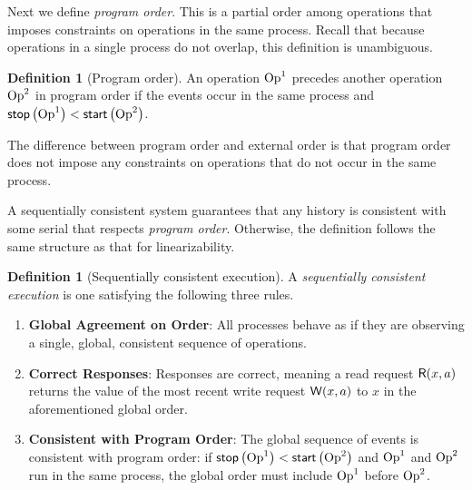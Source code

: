 \documentclass[]             %
{NASA}                       %
\theoremstyle{definition}
\newtheorem{definition}[theorem]{Definition}
\providecommand{\tightlist}{%
  \setlength{\itemsep}{0pt}\setlength{\parskip}{0pt}}
\begin{document}
Next we define \emph{program order}. This is a partial order among
operations that imposes constraints on operations in the same
process. Recall that because operations in a single process do not
overlap, this definition is unambiguous.

\begin{definition}[Program order]
  An operation $\mathrm{Op}^1$ precedes another operation $\mathrm{Op}^2$ in program
  order if the events occur in the same process and
  $\mathsf{stop}\left(\mathrm{Op}^1\right) < \mathsf{start}\left(\mathrm{Op}^2\right)$.
\end{definition}

The difference between program order and external order is that
program order does not impose any constraints on operations that do
not occur in the same process.

A sequentially consistent system guarantees that any history is
consistent with some serial that respects \emph{program
  order}. Otherwise, the definition follows the same structure as that
for linearizability.


\begin{definition}[Sequentially consistent execution]
  \label{def:sequentially-consistent-execution}
  A \emph{sequentially consistent execution} is one satisfying the following three rules.
\begin{enumerate}
  \tightlist
\item \textbf{Global Agreement on Order}: All processes behave as if
  they are observing a single, global, consistent sequence of
  operations.
\item \textbf{Correct Responses}: Responses are correct, meaning a read request
  \(\mathsf{R}\!\left(x, a\right)\) returns the value of the most recent write request
  \(\mathsf{W}\!\left(x, a\right)\) to \(x\) in the aforementioned global order.
\item \textbf{Consistent with Program Order}: The global sequence of
  events is consistent with program order: if
  $\mathsf{stop}\left(\mathrm{Op}^1\right) < \mathsf{start}\left(\mathrm{Op}^2\right)$ and $\mathrm{Op}^1$ and $\mathrm{Op}^2$ run in
  the same process, the global order must include $\mathrm{Op}^1$ before
  $\mathrm{Op}^2$.
\end{enumerate}
\end{definition}
\end{document}

